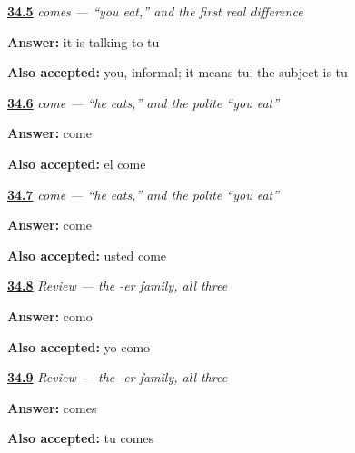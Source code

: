 \noindent\begin{minipage}[t]{\linewidth}
\raggedright
\hyperlink{review-ES-C07-comes-s}{\textbf{34.5}} \emph{comes — \textquotedblleft{}you eat,\textquotedblright{} and the first real difference}\par
\small \textbf{Answer:} it is talking to tu\par
\footnotesize \textbf{Also accepted:} you, informal; it means tu; the subject is tu
\end{minipage}\par\medskip

\noindent\begin{minipage}[t]{\linewidth}
\raggedright
\hyperlink{review-ES-C07-come-form}{\textbf{34.6}} \emph{come — \textquotedblleft{}he eats,\textquotedblright{} and the polite \textquotedblleft{}you eat\textquotedblright{}}\par
\small \textbf{Answer:} come\par
\footnotesize \textbf{Also accepted:} el come
\end{minipage}\par\medskip

\noindent\begin{minipage}[t]{\linewidth}
\raggedright
\hyperlink{review-ES-C07-come-usted}{\textbf{34.7}} \emph{come — \textquotedblleft{}he eats,\textquotedblright{} and the polite \textquotedblleft{}you eat\textquotedblright{}}\par
\small \textbf{Answer:} come\par
\footnotesize \textbf{Also accepted:} usted come
\end{minipage}\par\medskip

\noindent\begin{minipage}[t]{\linewidth}
\raggedright
\hyperlink{review-ES-C07-repaso-comer-i}{\textbf{34.8}} \emph{Review — the -er family, all three}\par
\small \textbf{Answer:} como\par
\footnotesize \textbf{Also accepted:} yo como
\end{minipage}\par\medskip

\noindent\begin{minipage}[t]{\linewidth}
\raggedright
\hyperlink{review-ES-C07-repaso-comer-you}{\textbf{34.9}} \emph{Review — the -er family, all three}\par
\small \textbf{Answer:} comes\par
\footnotesize \textbf{Also accepted:} tu comes
\end{minipage}\par\medskip

